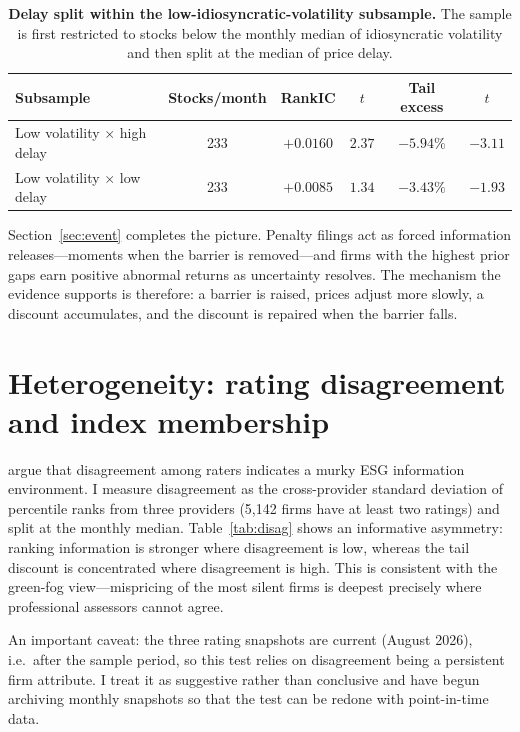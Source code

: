 \documentclass[12pt]{article}
\begin{document}
\begin{table}[t]
\centering\small
\caption{\textbf{Delay split within the low-idiosyncratic-volatility
subsample.} The sample is first restricted to stocks below the monthly median
of idiosyncratic volatility and then split at the median of price delay.}
\label{tab:triple}
\vspace{6pt}
\begin{tabular}{lccccc}
\toprule
Subsample & Stocks/month & RankIC & $t$ & Tail excess & $t$ \\
\midrule
Low volatility $\times$ high delay & 233 & $\mathbf{+0.0160}$ & $\mathbf{2.37}$ & $\mathbf{-5.94\%}$ & $\mathbf{-3.11}$ \\
Low volatility $\times$ low delay  & 233 & $+0.0085$ & $1.34$ & $-3.43\%$ & $-1.93$ \\
\bottomrule
\end{tabular}
\end{table}

Section~\ref{sec:event} completes the picture. Penalty filings act as forced
information releases---moments when the barrier is removed---and firms with the
highest prior gaps earn positive abnormal returns as uncertainty resolves. The
mechanism the evidence supports is therefore: a barrier is raised, prices
adjust more slowly, a discount accumulates, and the discount is repaired when
the barrier falls.

\section{Heterogeneity: rating disagreement and index membership}
\label{sec:hetero}

\citet{hu2023} argue that disagreement among raters indicates a murky ESG
information environment. I measure disagreement as the cross-provider standard
deviation of percentile ranks from three providers (5{,}142 firms have at least
two ratings) and split at the monthly median. Table~\ref{tab:disag} shows an
informative asymmetry: ranking information is stronger where disagreement is
low, whereas the tail discount is concentrated where disagreement is high. This
is consistent with the green-fog view---mispricing of the most silent firms is
deepest precisely where professional assessors cannot agree.

An important caveat: the three rating snapshots are current (August 2026),
i.e.\ after the sample period, so this test relies on disagreement being a
persistent firm attribute. I treat it as suggestive rather than conclusive and
have begun archiving monthly snapshots so that the test can be redone with
point-in-time data.
\end{document}

